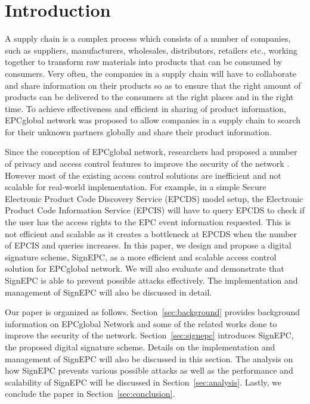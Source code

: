 \documentclass[conference]{IEEEtran}
\begin{document}
\section{Introduction}
A supply chain is a complex process which consists of a number of companies, such as suppliers, manufacturers, wholesales, distributors, retailers etc., working together to transform raw materials into products that can be consumed by consumers. Very often, the companies in a supply chain will have to collaborate and share information on their products so as to ensure that the right amount of products can be delivered to the consumers at the right places and in the right time. To achieve effectiveness and efficient in sharing of product information, EPCglobal network \cite{epcglobal} was proposed to allow companies in a supply chain to search for their unknown partners globally and share their product information.

Since the conception of EPCglobal network, researchers had proposed a number of privacy and access control features to improve the security of the network \cite{shi:platform}. However most of the existing access control solutions are inefficient and not scalable for real-world implementation. For example, in a simple Secure Electronic Product Code Discovery Service (EPCDS) model setup, the Electronic Product Code Information Service (EPCIS) will have to query EPCDS to check if the user has the access rights to the EPC event information requested. This is not efficient and scalable as it creates a bottleneck at EPCDS when the number of EPCIS and queries increases. In this paper, we design and propose a digital signature scheme, SignEPC, as a more efficient and scalable access control solution for EPCglobal network. We will also evaluate and demonstrate that SignEPC is able to prevent possible attacks effectively. The implementation and management of SignEPC will also be discussed in detail.

Our paper is organized as follows. Section~\ref{sec:background} provides background information on EPCglobal Network and some of the related works done to improve the security of the network. Section~\ref{sec:signepc} introduces SignEPC, the proposed digital signature scheme. Details on the implementation and management of SignEPC will also be discussed in this section. The analysis on how SignEPC prevents various possible attacks as well as the performance and scalability of SignEPC will be discussed in Section~\ref{sec:analysis}. Lastly, we conclude the paper in Section~\ref{sec:conclusion}.
\end{document}
